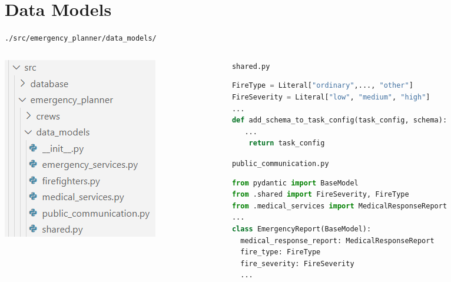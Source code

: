 \section*{Data Models}
\begin{frame}[fragile]{\texttt{./src/emergency\_planner/data\_models/}}
  \begin{columns}[c]
    \begin{column}{0.3\textwidth}
        \includegraphics[width=\textwidth]{figures/data_models_folder.png}
    \end{column}
    \begin{column}{0.68\textwidth}
      \texttt{shared.py}
      \begin{lstlisting}[language=Python, breaklines=true]
FireType = Literal["ordinary",..., "other"]
FireSeverity = Literal["low", "medium", "high"]
... 
def add_schema_to_task_config(task_config, schema):
   ...
    return task_config
      \end{lstlisting}
      \texttt{public\_communication.py}
      \begin{lstlisting}[language=Python, breaklines=true]
from pydantic import BaseModel
from .shared import FireSeverity, FireType
from .medical_services import MedicalResponseReport
...
class EmergencyReport(BaseModel):
  medical_response_report: MedicalResponseReport
  fire_type: FireType
  fire_severity: FireSeverity
  ...
      \end{lstlisting}
    \end{column}
  \end{columns}
\end{frame}